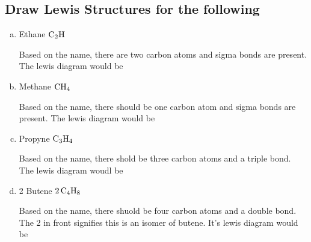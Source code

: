 \documentclass{scrartcl}
\begin{document}
\subsection{Draw Lewis Structures for the following}
\label{sec:org4cf9fb7}
\begin{enumerate}[a.]
\item Ethane \(\ce{C2H}\)

Based on the name, there are two carbon atoms and sigma bonds are present.
The lewis diagram would be

\item Methane \(\ce{CH4}\)

Based on the name, there should be one carbon atom and sigma bonds are
present. The lewis diagram would be

\item Propyne \(\ce{C3H4}\)

Based on the name, there shold be three carbon atoms and a triple bond. The
lewis diagram woudl be

\item 2 Butene \(\ce{2C4H8}\)

Based on the name, there shuold be four carbon atoms and a double bond. The 2
in front signifies this is an isomer of butene. It's lewis diagram would be
\end{enumerate}
\end{document}
